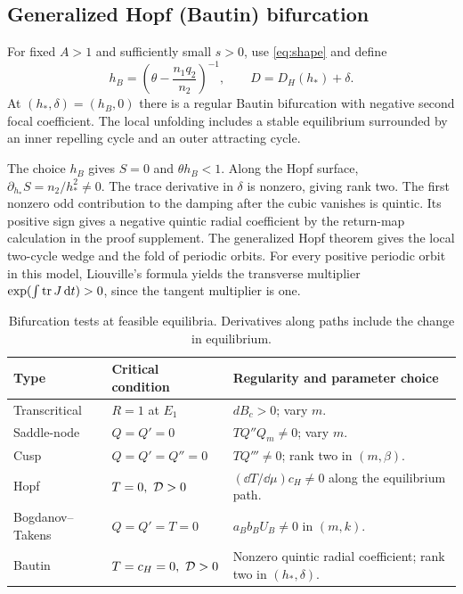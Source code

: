 \subsection{Generalized Hopf (Bautin) bifurcation}
\begin{theorem}\label{thm:bautin}
For fixed \(A>1\) and sufficiently small \(s>0\), use \eqref{eq:shape} and define
\[
 h_B=\left(\theta-\frac{n_1q_2}{n_2}\right)^{-1},\qquad D=D_H(h_*)+\delta.
\]
At \((h_*,\delta)=(h_B,0)\) there is a regular Bautin bifurcation with negative second focal coefficient. The local unfolding includes a stable equilibrium surrounded by an inner repelling cycle and an outer attracting cycle.
\end{theorem}
The choice \(h_B\) gives \(S=0\) and \(\theta h_B<1\). Along the Hopf surface, \(\partial_{h_*}S=n_2/h_*^2\ne0\). The trace derivative in \(\delta\) is nonzero, giving rank two. The first nonzero odd contribution to the damping after the cubic vanishes is quintic. Its positive sign gives a negative quintic radial coefficient by the return-map calculation in the proof supplement. The generalized Hopf theorem gives the local two-cycle wedge and the fold of periodic orbits. For every positive periodic orbit in this model, Liouville's formula yields the transverse multiplier \(\exp(\int\operatorname{tr} J\,\mathrm{d} t)>0\), since the tangent multiplier is one.

\begin{table}[tbp]\centering
\caption{Bifurcation tests at feasible equilibria. Derivatives along paths include the change in equilibrium.}\label{tab:bif}
\begin{tabularx}{\linewidth}{@{}lYY@{}}\toprule
Type & Critical condition & Regularity and parameter choice \\ \midrule
Transcritical & \(R=1\) at \(E_1\) & \(dB_c>0\); vary \(m\).\\
Saddle-node & \(Q=Q'=0\) & \(TQ''Q_m\ne0\); vary \(m\).\\
Cusp & \(Q=Q'=Q''=0\) & \(TQ'''\ne0\); rank two in \((m,\beta)\).\\
Hopf & \(T=0,\ \mathcal D>0\) & \((\dd T/\dd\mu)c_H\ne0\) along the equilibrium path.\\
Bogdanov--Takens & \(Q=Q'=T=0\) & \(a_B b_B U_B\ne0\) in \((m,k)\).\\
Bautin & \(T=c_H=0,\ \mathcal D>0\) & Nonzero quintic radial coefficient; rank two in \((h_*,\delta)\).\\
\bottomrule\end{tabularx}
\end{table}

